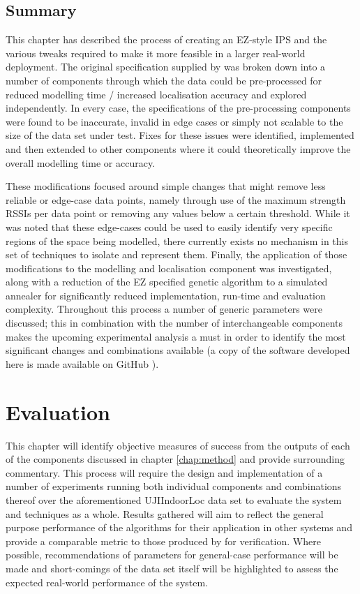 \documentclass{UoYCSproject}
\begin{document}
		\section{Summary}
		
			This chapter has described the process of creating an EZ-style IPS and the various tweaks required to make it more feasible in a larger real-world deployment. The original specification supplied by \citet{chintalapudi2010indoor} was broken down into a number of components through which the data could be pre-processed for reduced modelling time / increased localisation accuracy and explored independently. In every case, the specifications of the pre-processing components were found to be inaccurate, invalid in edge cases or simply not scalable to the size of the data set under test. Fixes for these issues were identified, implemented and then extended to other components where it could theoretically improve the overall modelling time or accuracy.
            
            These modifications focused around simple changes that might remove less reliable or edge-case data points, namely through use of the maximum strength RSSIs per data point or removing any values below a certain threshold. While it was noted that these edge-cases could be used to easily identify very specific regions of the space being modelled, there currently exists no mechanism in this set of techniques to isolate and represent them. Finally, the application of those modifications to the modelling and localisation component was investigated, along with a reduction of the EZ specified genetic algorithm to a simulated annealer for significantly reduced implementation, run-time and evaluation complexity. Throughout this process a number of generic parameters were discussed; this in combination with the number of interchangeable components makes the upcoming experimental analysis a must in order to identify the most significant changes and combinations available (a copy of the software developed here is made available on GitHub \citep{git}).
        
	\chapter{Evaluation}
    \label{chap:eval}
    
        This chapter will identify objective measures of success from the outputs of each of the components discussed in chapter \ref{chap:method} and provide surrounding commentary. This process will require the design and implementation of a number of experiments running both individual components and combinations thereof over the aforementioned UJIIndoorLoc data set \cite{torres2014ujiindoorloc} to evaluate the system and techniques as a whole. Results gathered will aim to reflect the general purpose performance of the algorithms for their application in other systems and provide a comparable metric to those produced by \citet{chintalapudi2010indoor} for verification. Where possible, recommendations of parameters for general-case performance will be made and short-comings of the data set itself will be highlighted to assess the expected real-world performance of the system.
    
\end{document}
